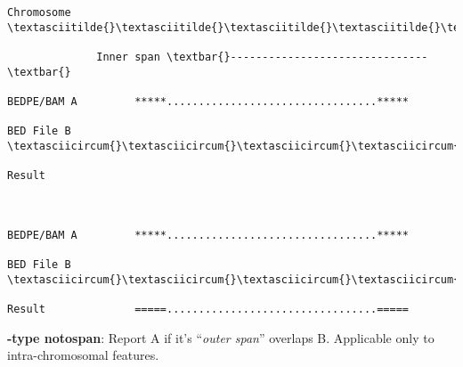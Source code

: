 \documentclass[letterpaper,10pt,english]{sphinxmanual}
\begin{document}
\begin{Verbatim}[commandchars=\\\{\}]
Chromosome  \textasciitilde{}\textasciitilde{}\textasciitilde{}\textasciitilde{}\textasciitilde{}\textasciitilde{}\textasciitilde{}\textasciitilde{}\textasciitilde{}\textasciitilde{}\textasciitilde{}\textasciitilde{}\textasciitilde{}\textasciitilde{}\textasciitilde{}\textasciitilde{}\textasciitilde{}\textasciitilde{}\textasciitilde{}\textasciitilde{}\textasciitilde{}\textasciitilde{}\textasciitilde{}\textasciitilde{}\textasciitilde{}\textasciitilde{}\textasciitilde{}\textasciitilde{}\textasciitilde{}\textasciitilde{}\textasciitilde{}\textasciitilde{}\textasciitilde{}\textasciitilde{}\textasciitilde{}\textasciitilde{}\textasciitilde{}\textasciitilde{}\textasciitilde{}\textasciitilde{}\textasciitilde{}\textasciitilde{}\textasciitilde{}\textasciitilde{}\textasciitilde{}\textasciitilde{}\textasciitilde{}\textasciitilde{}\textasciitilde{}\textasciitilde{}\textasciitilde{}\textasciitilde{}\textasciitilde{}\textasciitilde{}\textasciitilde{}\textasciitilde{}\textasciitilde{}\textasciitilde{}\textasciitilde{}\textasciitilde{}\textasciitilde{}\textasciitilde{}\textasciitilde{}\textasciitilde{}

              Inner span \textbar{}-------------------------------\textbar{}

BEDPE/BAM A         *****.................................*****

BED File B                         \textasciicircum{}\textasciicircum{}\textasciicircum{}\textasciicircum{}\textasciicircum{}\textasciicircum{}\textasciicircum{}\textasciicircum{}

Result



BEDPE/BAM A         *****.................................*****

BED File B         \textasciicircum{}\textasciicircum{}\textasciicircum{}\textasciicircum{}

Result              =====.................................=====
\end{Verbatim}

\textbf{-type notospan}: Report A if it's ``\emph{outer span}'' overlaps B. Applicable only to intra-chromosomal
features.
\end{document}
